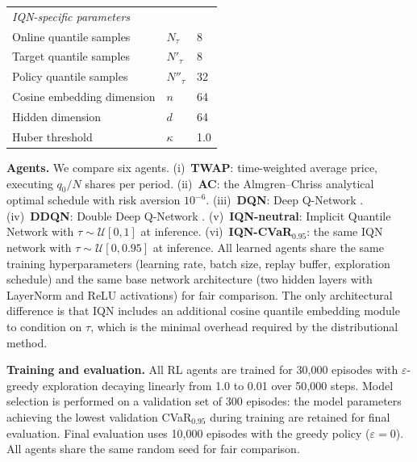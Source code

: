 \documentclass[11pt]{article}
\begin{document}
\begin{table}[H]
\begin{tabular}{@{}lll@{}}
        \midrule
        \multicolumn{3}{l}{\textit{IQN-specific parameters}} \\
        Online quantile samples    & $N_\tau$        & 8 \\
        Target quantile samples    & $N'_\tau$       & 8 \\
        Policy quantile samples    & $N''_\tau$      & 32 \\
        Cosine embedding dimension & $n$             & 64 \\
        Hidden dimension           & $d$             & 64 \\
        Huber threshold            & $\kappa$        & 1.0 \\
        \bottomrule
    \end{tabular}
\end{table}

\textbf{Agents.}  We compare six agents.  (i)~\textbf{TWAP}: time-weighted average price, executing $q_0/N$ shares per period.  (ii)~\textbf{AC}: the Almgren--Chriss analytical optimal schedule \citet{almgren2001optimal} with risk aversion $10^{-6}$.  (iii)~\textbf{DQN}: Deep Q-Network \citet{mnih2015human}.  (iv)~\textbf{DDQN}: Double Deep Q-Network \citet{van2016deep}.  (v)~\textbf{IQN-neutral}: Implicit Quantile Network with $\tau \sim \mathcal{U}[0, 1]$ at inference.  (vi)~\textbf{IQN-CVaR$_{0.95}$}: the same IQN network with $\tau \sim \mathcal{U}[0, 0.95]$ at inference. All learned agents share the same training hyperparameters 
(learning rate, batch size, replay buffer, exploration 
schedule) and the same base network architecture (two hidden 
layers with LayerNorm and ReLU activations) for fair 
comparison. The only architectural difference is that IQN 
includes an additional cosine quantile embedding module to 
condition on $\tau$, which is the minimal overhead required 
by the distributional method.

\textbf{Training and evaluation.}  All RL agents are trained for 30{,}000 episodes with $\varepsilon$-greedy exploration decaying linearly from 1.0 to 0.01 over 50{,}000 steps.  Model selection is performed on a validation set of 300 
episodes: the model parameters achieving the lowest 
validation CVaR$_{0.95}$ during training are retained 
for final evaluation.  Final evaluation uses 10{,}000 episodes with the greedy policy ($\varepsilon = 0$).  All agents share the same random seed for fair comparison.
\end{document}
